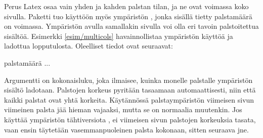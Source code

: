 Perus Latex osaa vain yhden ja kahden palstan tilan, ja ne ovat voimassa
koko sivulla. Paketti  tuo käyttöön myös
ympäristön , jonka sisällä tietty palstamäärä on
voimassa. Ympäristön avulla samallakin sivulla voi olla eri tavoin
palstoitettua sisältöä. Esimerkki \ref{esim/multicols} havainnollistaa
ympäristön käyttöä ja ladottua lopputulosta. Oleelliset tiedot ovat
seuraavat:

\begin{koodilohkosis}
\begin{multicols}{palstamäärä}
  ...
\end{multicols}
\end{koodilohkosis}

\noindent
Argumentti  on kokonaisluku, joka ilmaisee, kuinka
monelle palstalle ympäristön sisältö ladotaan. Palstojen korkeus
pyritään tasaamaan automaattisesti, niin että kaikki palstat ovat yhtä
korkeita. Käytännössä palstaympäristön viimeisen sivun viimeinen palsta
jää hieman vajaaksi, mutta se on normaalia muutenkin. Jos käyttää
ympäristön tähtiversiota , ei viimeisen sivun
palstojen korkeuksia tasata, vaan ensin täytetään vasemmanpuoleinen
palsta kokonaan, sitten seuraava jne.

